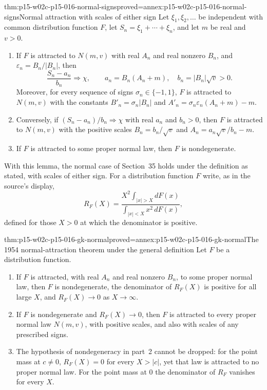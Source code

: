 \begin{hblemma}{thm:p15-w02c-p15-016-normal-signs}{proved=annex:p15-w02c-p15-016-normal-signs}{Normal attraction with scales of either sign}
Let \(\xi_1,\xi_2,\ldots\) be independent with common distribution
function \(F\), let \(S_n=\xi_1+\cdots+\xi_n\), and let \(m\) be real
and \(v>0\).
\begin{enumerate}
\item If \(F\) is attracted to \(N(m,v)\) with real \(A_n\) and real
 nonzero \(B_n\), and \(\varepsilon_n=B_n/|B_n|\), then
 \[
  \frac{S_n-a_n}{b_n}\Rightarrow\chi,\qquad
  a_n=B_n(A_n+m),\quad b_n=|B_n|\sqrt v>0 .
 \]
 Moreover, for every sequence of signs \(\sigma_n\in\{-1,1\}\),
 \(F\) is attracted to \(N(m,v)\) with the constants
 \(B'_n=\sigma_n|B_n|\) and \(A'_n=\sigma_n\varepsilon_n(A_n+m)-m\).
\item Conversely, if \((S_n-a_n)/b_n\Rightarrow\chi\) with real \(a_n\)
 and \(b_n>0\), then \(F\) is attracted to \(N(m,v)\) with the
 positive scales \(B_n=b_n/\sqrt v\) and
 \(A_n=a_n\sqrt v/b_n-m\).
\item If \(F\) is attracted to some proper normal law, then \(F\) is
 nondegenerate.
\end{enumerate}
\end{hblemma}

With this lemma, the normal case of Section~35 holds under the
definition as stated, with scales of either sign. For a distribution
function \(F\) write, as in the source's display,
\[
 R_F(X)=\frac{X^2\int_{|x|>X}dF(x)}{\int_{|x|<X}x^2\,dF(x)} ,
\]
defined for those \(X>0\) at which the denominator is positive.

\begin{hbtheorem}{thm:p15-w02c-p15-016-gk-normal}{proved=annex:p15-w02c-p15-016-gk-normal}{The 1954 normal-attraction theorem under the general definition}
Let \(F\) be a distribution function.
\begin{enumerate}
\item If \(F\) is attracted, with real \(A_n\) and real nonzero
 \(B_n\), to some proper normal law, then \(F\) is nondegenerate, the
 denominator of \(R_F(X)\) is positive for all large \(X\), and
 \(R_F(X)\to0\) as \(X\to\infty\).
\item If \(F\) is nondegenerate and \(R_F(X)\to0\), then \(F\) is
 attracted to every proper normal law \(N(m,v)\), with positive
 scales, and also with scales of any prescribed signs.
\item The hypothesis of nondegeneracy in part~2 cannot be dropped: for
 the point mass at \(c\neq0\), \(R_F(X)=0\) for every \(X>|c|\), yet
 that law is attracted to no proper normal law. For the point mass at
 \(0\) the denominator of \(R_F\) vanishes for every \(X\).
\end{enumerate}
\end{hbtheorem}

